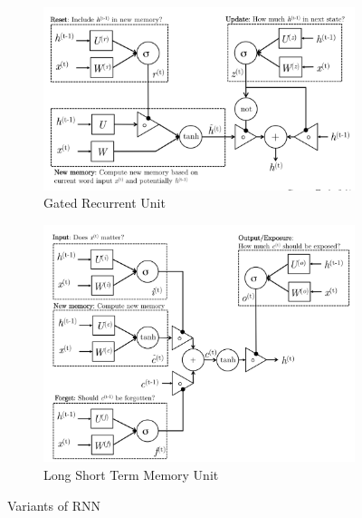 \documentclass{article}
\begin{document}
\begin{appendices}
	\begin{figure}
		\centering
		\begin{subfigure}{0.49\textwidth}
			\label{fig:gru}
			\centering
			\includegraphics[width=1\textwidth]{fig/gru.png}
			\caption{Gated Recurrent Unit}
		\end{subfigure}
		\hspace*{\fill} %
		\begin{subfigure}{0.49\textwidth}
			\label{fig:lstm}
			\centering
			\includegraphics[width=1\textwidth]{fig/lstm.png}
			\caption{Long Short Term Memory Unit}
		\end{subfigure}
		\caption{Variants of RNN}
		\label{fig:rnna}
	\end{figure}

\end{appendices}
\end{document}
